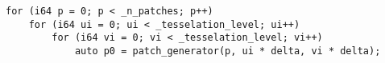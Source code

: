 \begin{lstlisting}
for (i64 p = 0; p < _n_patches; p++)
    for (i64 ui = 0; ui < _tesselation_level; ui++)
        for (i64 vi = 0; vi < _tesselation_level; vi++)
            auto p0 = patch_generator(p, ui * delta, vi * delta);
\end{lstlisting}
